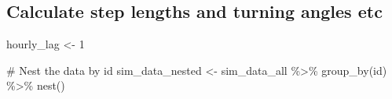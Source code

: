 \documentclass[
  letterpaper,
  DIV=11,
  numbers=noendperiod]{scrartcl}
\newenvironment{Shaded}{\begin{snugshade}}{\end{snugshade}}
\newcommand{\CommentTok}[1]{\textcolor[rgb]{0.37,0.37,0.37}{#1}}
\newcommand{\DecValTok}[1]{\textcolor[rgb]{0.68,0.00,0.00}{#1}}
\newcommand{\FunctionTok}[1]{\textcolor[rgb]{0.28,0.35,0.67}{#1}}
\newcommand{\NormalTok}[1]{\textcolor[rgb]{0.00,0.23,0.31}{#1}}
\newcommand{\OtherTok}[1]{\textcolor[rgb]{0.00,0.23,0.31}{#1}}
\newcommand{\SpecialCharTok}[1]{\textcolor[rgb]{0.37,0.37,0.37}{#1}}
\begin{document}
\subsection{Calculate step lengths and turning angles
etc}\label{calculate-step-lengths-and-turning-angles-etc}

\begin{Shaded}
\begin{Highlighting}[]
\NormalTok{hourly\_lag }\OtherTok{\textless{}{-}} \DecValTok{1}

\CommentTok{\# Nest the data by \textquotesingle{}id\textquotesingle{}}
\NormalTok{sim\_data\_nested }\OtherTok{\textless{}{-}}\NormalTok{ sim\_data\_all }\SpecialCharTok{\%\textgreater{}\%} 
  \FunctionTok{group\_by}\NormalTok{(id) }\SpecialCharTok{\%\textgreater{}\%}
  \FunctionTok{nest}\NormalTok{()}


\end{Highlighting}
\end{Shaded}
\end{document}
